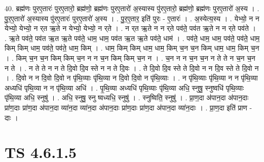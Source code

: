 \documentclass[17pt]{extarticle}
\begin{document}
40. ब्रह्म॑णः पुरए॒तारः॑ पुरए॒तारो॒ ब्रह्म॑णो॒ ब्रह्म॑णः पुरए॒तारो॑ अ॒स्यास्य पु॑रए॒तारो॒ ब्रह्म॑णो॒ ब्रह्म॑णः पुरए॒तारो॑ अ॒स्य । . पु॒र॒ए॒तारो॑ अ॒स्यास्य पु॑रए॒तारः॑ पुरए॒तारो॑ अ॒स्य । . पु॒र॒ए॒तार॒ इति॑ पुरः - ए॒तारः॑ । . अ॒स्येत्य॒स्य । . येभ्यो॒ न न येभ्यो॒ येभ्यो॒ न र्‌त ऋ॒ते न येभ्यो॒ येभ्यो॒ न र्‌ते । . न र्‌त ऋ॒ते न न र्‌ते पव॑ते॒ पव॑त ऋ॒ते न न र्‌ते पव॑ते । . ऋ॒ते पव॑ते॒ पव॑त ऋ॒त ऋ॒ते पव॑ते॒ धाम॒ धाम॒ पव॑त ऋ॒त ऋ॒ते पव॑ते॒ धाम॑ । . पव॑ते॒ धाम॒ धाम॒ पव॑ते॒ पव॑ते॒ धाम॒ किम् किम् धाम॒ पव॑ते॒ पव॑ते॒ धाम॒ किम् । . धाम॒ किम् किम् धाम॒ धाम॒ किम् च॒न च॒न किम् धाम॒ धाम॒ किम् च॒न । . किम् च॒न च॒न किम् किम् च॒न न न च॒न किम् किम् च॒न न । . च॒न न न च॒न च॒न न ते ते न च॒न च॒न न ते । . न ते ते न न ते दि॒वो दि॒व स्ते न न ते दि॒वः । . ते दि॒वो दि॒व स्ते ते दि॒वो न न दि॒व स्ते ते दि॒वो न । . दि॒वो न न दि॒वो दि॒वो न पृ॑थि॒व्याः पृ॑थि॒व्या न दि॒वो दि॒वो न पृ॑थि॒व्याः । . न पृ॑थि॒व्याः पृ॑थि॒व्या न न पृ॑थि॒व्या अध्यधि॑ पृथि॒व्या न न पृ॑थि॒व्या अधि॑ । . पृ॒थि॒व्या अध्यधि॑ पृथि॒व्याः पृ॑थि॒व्या अधि॒ स्नुषु॒ स्नुष्वधि॑ पृथि॒व्याः पृ॑थि॒व्या अधि॒ स्नुषु॑ । . अधि॒ स्नुषु॒ स्नु ष्वध्यधि॒ स्नुषु॑ । . स्नुष्विति॒ स्नुषु॑ । . प्रा॒ण॒दा अ॑पान॒दा अ॑पान॒दाः प्रा॑ण॒दाः प्रा॑ण॒दा अ॑पान॒दा व्या॑न॒दा व्या॑न॒दा अ॑पान॒दाः प्रा॑ण॒दाः प्रा॑ण॒दा अ॑पान॒दा व्या॑न॒दाः । . प्रा॒ण॒दा इति॑ प्राण - दाः । \newline
\pagebreak
{}

\section{ TS 4.6.1.5 }
\end{document}
